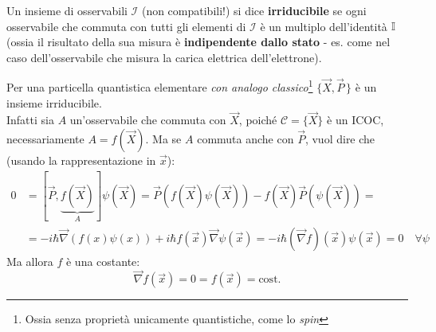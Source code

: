 \documentclass[../../FisicaTeorica.tex]{subfiles}
\begin{document}
\begin{dfn}
Un insieme di osservabili $\mathcal{I}$ (non compatibili!) si dice \textbf{irriducibile} se ogni osservabile che commuta con tutti gli elementi di $\mathcal{I}$ è un multiplo dell'identità $\mathbb{I}$ (ossia il risultato della sua misura è  \textbf{indipendente dallo stato} - es. come nel caso dell'osservabile che misura la carica elettrica dell'elettrone).
\end{dfn}
\begin{oss}
Per una particella quantistica elementare \textit{con analogo classico}\footnote{Ossia senza proprietà unicamente quantistiche, come lo \textit{spin}} $\{\vec{X},\vec{P}\,\}$ è un insieme irriducibile.\\ %
Infatti sia $A$ un'osservabile che commuta con $\vec{X}$, poiché $\mathcal{C}=\{\vec{X}\}$ è un ICOC, necessariamente $A=f(\vec{X})$. Ma se $A$ commuta anche con $\vec{P}$, vuol dire che (usando la rappresentazione in $\vec{x}$):
\begin{align*}
0&=[\vec{P}, \underbrace{f(\vec{X})}_{A}]\psi(\vec{X})=
\vec{P}(f(\vec{X})\psi(\vec{X}))-f(\vec{X})\vec{P}(\psi(\vec{X}))=\\
&=-i\hbar \vec{\nabla}(f(x)\psi(x))+i\hbar f(\vec{x})\vec{\nabla}\psi(\vec{x}) = -i\hbar(\vec{\nabla}f)(\vec{x})\psi(\vec{x})=0 \quad \forall \psi
\end{align*}
Ma allora $f$ è una costante:
\[
\vec{\nabla}f(\vec{x})=0=f(\vec{x})=\text{cost.}
\]
\end{oss}
\end{document}
